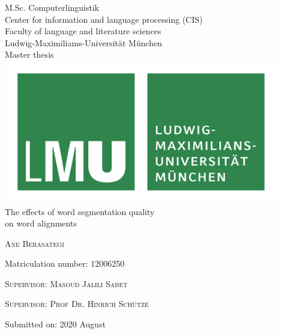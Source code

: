 %
%

\begin{titlepage}
	\begin{center}
		\normalsize
		M.Sc. Computerlinguistik \\
		Center for information and language processing (CIS)  \\
		Faculty of language and literature sciences \\
		Ludwig-Maximiliams-Universität München \\
		\vspace{1cm} %
		\huge
		Master thesis \\
		\vspace{1.5cm}
		\includegraphics[width=12cm]{figures/lmu_logo.png} \\ %
		\vspace{1cm}
		\Huge 
		The effects of word segmentation quality \\
		on word alignments \\
		\vspace{1cm}
		{\Large\scshape Ane Berasategi \par}
		\normalsize
		{Matriculation number: 12006250 \par}
		\vfill
		\vspace{1.5cm}
		{\scshape Supervisor: Masoud Jalili Sabet \par}
		{\scshape Supervisor: Prof Dr. Hinrich Schütze \par}
		{Submitted on: 2020 August \par} %
		\vspace{1cm}
	\end{center}
	\vfill %
\end{titlepage}

